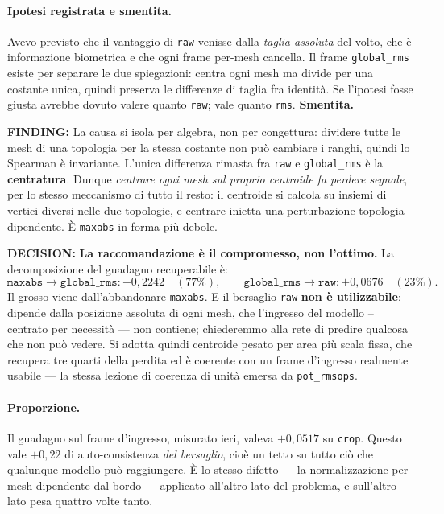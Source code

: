 \documentclass[11pt,a4paper]{article}
\newcommand{\finding}[1]{\textcolor{finding}{\textbf{FINDING:}} #1}
\newcommand{\decision}[1]{\textcolor{decision}{\textbf{DECISION:}} #1}
\begin{document}
\paragraph{Ipotesi registrata e smentita.} Avevo previsto che il vantaggio di \texttt{raw}
venisse dalla \emph{taglia assoluta} del volto, che \`e informazione biometrica e che ogni frame
per-mesh cancella. Il frame \texttt{global\_rms} esiste per separare le due spiegazioni: centra
ogni mesh ma divide per una costante unica, quindi preserva le differenze di taglia fra
identit\`a. Se l'ipotesi fosse giusta avrebbe dovuto valere quanto \texttt{raw}; vale quanto
\texttt{rms}. \textbf{Smentita.}

\finding{La causa si isola per algebra, non per congettura: dividere tutte le mesh di una
topologia per la stessa costante non pu\`o cambiare i ranghi, quindi lo Spearman \`e invariante.
L'unica differenza rimasta fra \texttt{raw} e \texttt{global\_rms} \`e la \textbf{centratura}.
Dunque \emph{centrare ogni mesh sul proprio centroide fa perdere segnale}, per lo stesso
meccanismo di tutto il resto: il centroide si calcola su insiemi di vertici diversi nelle due
topologie, e centrare inietta una perturbazione topologia-dipendente. \`E \texttt{maxabs} in
forma pi\`u debole.}

\decision{\textbf{La raccomandazione \`e il compromesso, non l'ottimo.} La decomposizione del
guadagno recuperabile \`e:
\[
\texttt{maxabs} \to \texttt{global\_rms}: +0{,}2242 \quad (77\%), \qquad
\texttt{global\_rms} \to \texttt{raw}: +0{,}0676 \quad (23\%).
\]
Il grosso viene dall'abbandonare \texttt{maxabs}. E il bersaglio \texttt{raw} \textbf{non \`e
utilizzabile}: dipende dalla posizione assoluta di ogni mesh, che l'ingresso del modello --
centrato per necessit\`a --- non contiene; chiederemmo alla rete di predire qualcosa che non pu\`o
vedere. Si adotta quindi centroide pesato per area pi\`u scala fissa, che recupera tre quarti
della perdita ed \`e coerente con un frame d'ingresso realmente usabile --- la stessa lezione di
coerenza di unit\`a emersa da \texttt{pot\_rmsops}.}

\paragraph{Proporzione.} Il guadagno sul frame d'ingresso, misurato ieri, valeva $+0{,}0517$ su
\texttt{crop}. Questo vale $+0{,}22$ di auto-consistenza \emph{del bersaglio}, cio\`e un tetto su
tutto ci\`o che qualunque modello pu\`o raggiungere. \`E lo stesso difetto --- la normalizzazione
per-mesh dipendente dal bordo --- applicato all'altro lato del problema, e sull'altro lato pesa
quattro volte tanto.
\end{document}
